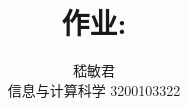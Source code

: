 \documentclass{ctexart}
\title{作业:}
\author{嵇敏君 \\信息与计算科学 3200103322 }
\begin{document}
\maketitle


\section{}
\subsection{}
\section{}
\end{document}

